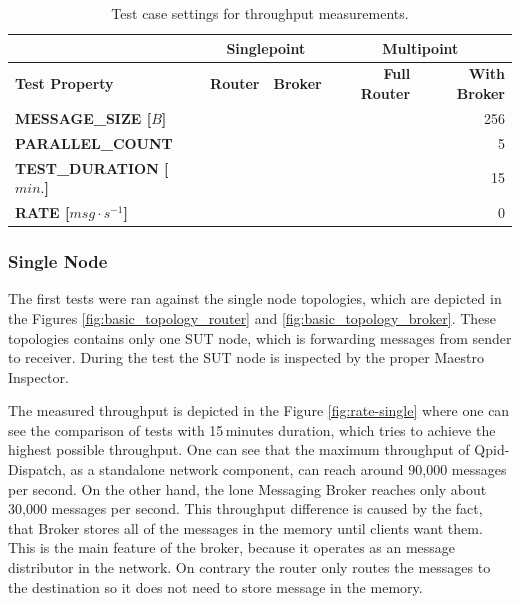 \begingroup
\setlength{\tabcolsep}{10pt} %
\renewcommand{\arraystretch}{1.35} %
	\begin{table}[H]
	\centering
	\begin{tabular}{|l|r|r|r|r|}
	\hline

	\rowcolor[HTML]{C5E3DF}
	           & \multicolumn{2}{c|}{\textbf{Singlepoint}} & \multicolumn{2}{c|}{\textbf{Multipoint}} \\ \hline
	\rowcolor[HTML]{C5E3DF}
	\textbf{Test Property} & \textbf{Router}            & \textbf{Broker}                 & \textbf{Full Router}            & \textbf{With Broker}           \\ \hline
	\textbf{MESSAGE\_SIZE [$B$]}                        & \multicolumn{4}{r|}{256}                    \\ \hline
	\textbf{PARALLEL\_COUNT}                            & \multicolumn{4}{r|}{5}                      \\ \hline
	\textbf{TEST\_DURATION [$min.$]}                       & \multicolumn{4}{r|}{15}                    \\ \hline
	\textbf{RATE [$msg \cdot s^{-1}$]}                                       & \multicolumn{4}{r|}{0}                   		\\ \hline
	\end{tabular}
	\caption{Test case settings for throughput measurements.}
	\label{tab:test_case_throughput}
	\end{table}
\endgroup


\subsubsection*{Single Node}
The first tests were ran against the single node topologies, which are depicted in the Figures \ref{fig:basic_topology_router} and \ref{fig:basic_topology_broker}. These topologies contains only one SUT node, which is forwarding messages from sender to receiver. During the test the SUT node is inspected by the proper Maestro Inspector.

The measured throughput is depicted in the Figure \ref{fig:rate-single} where one can see the comparison of tests with 15\,minutes duration, which tries to achieve the highest possible throughput. One can see that the maximum throughput of Qpid-Dispatch, as a standalone network component, can reach around 90,000 messages per second. On the other hand, the lone Messaging Broker reaches only about 30,000 messages per second. This throughput difference is caused by the fact, that Broker stores all of the messages in the memory until clients want them. This is the main feature of the broker, because it operates as an message distributor in the network. On contrary the router only routes the messages to the destination so it does not need to store message in the memory.


